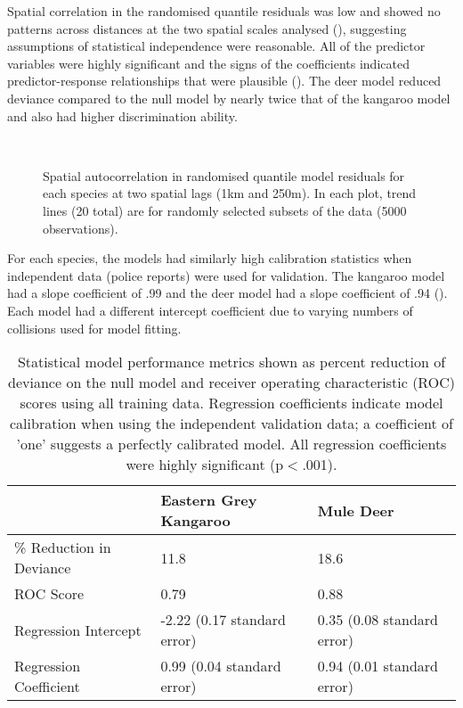 Spatial correlation in the randomised quantile residuals was low and showed no patterns across distances at the two spatial scales analysed (), suggesting assumptions of statistical independence were reasonable. All of the predictor variables were highly significant and the signs of the coefficients indicated predictor-response relationships that were plausible (). The deer model reduced deviance compared to the null model by nearly twice that of the kangaroo model and also had higher discrimination ability.

\begin{figure*}[htp]
  \captionsetup[subfloat]{farskip=-2pt,nearskip=-2pt}
  \centering
  \\
  \caption[Spatial autocorrelation in randomised quantile model residuals for kangaroos and deer]{Spatial autocorrelation in randomised quantile model residuals for each species at two spatial lags (1km and 250m).  In each plot, trend lines (20 total) are for randomly selected subsets of the data (5000 observations).}
  \label{cal_sac}
\end{figure*}

For each species, the models had similarly high calibration statistics when independent data (police reports) were used for validation. The kangaroo model had a slope coefficient of .99 and the deer model had a slope coefficient of .94 (). Each model had a different intercept coefficient due to varying numbers of collisions used for model fitting.

\begin{table}[htp]
\caption[Statistical model performance for kangaroos and deer]{Statistical model performance metrics shown as percent reduction of deviance on the null model and receiver operating characteristic (ROC) scores using all training data. Regression coefficients indicate model calibration when using the independent validation data; a coefficient of 'one' suggests a perfectly calibrated model.  All regression coefficients were highly significant (p$<$.001).}
\begin{tabularx}{0.9\textwidth}{lll} \toprule
                        	&Eastern Grey Kangaroo			&Mule Deer \\ \midrule 
\% Reduction in Deviance 	& 11.8							& 18.6  \\ 
ROC Score 					& 0.79							& 0.88	\\ 
Regression Intercept 		& -2.22 (0.17 standard error)	& 0.35 (0.08 standard error) \\ 
Regression Coefficient 		& 0.99 (0.04 standard error)	& 0.94 (0.01 standard error) \\ 
\bottomrule
\end{tabularx}
\label{cal_model_perf}
\end{table}

